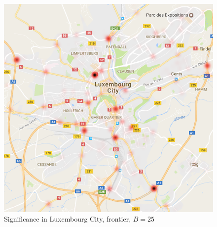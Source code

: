 \begin{figure}
\begin{center}
\includegraphics[scale=0.37]{TexImg/map_LU_sig.png}
\end{center}
\caption{Significance in Luxembourg City, frontier, $B=25$}\label{fig:map_LU} 
\end{figure}
